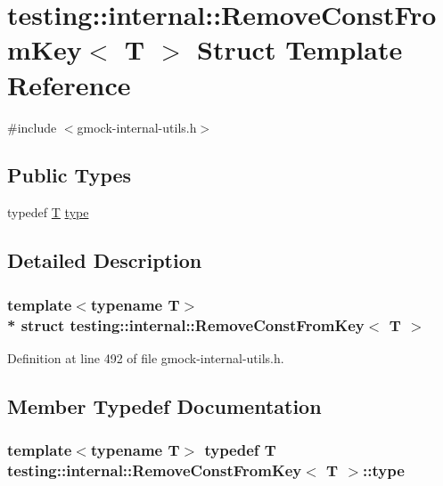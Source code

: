 \hypertarget{structtesting_1_1internal_1_1_remove_const_from_key}{}\section{testing\+:\+:internal\+:\+:Remove\+Const\+From\+Key$<$ T $>$ Struct Template Reference}
\label{structtesting_1_1internal_1_1_remove_const_from_key}


{\ttfamily \#include $<$gmock-\/internal-\/utils.\+h$>$}

\subsection*{Public Types}
\begin{DoxyCompactItemize}
\item 
typedef \hyperlink{functions__7_8js_adf1f3edb9115acb0a1e04209b7a9937b}{T} \hyperlink{structtesting_1_1internal_1_1_remove_const_from_key_ab657b0a0fe4ebc499d27011f73c794c1}{type}
\end{DoxyCompactItemize}


\subsection{Detailed Description}
\subsubsection*{template$<$typename T$>$\\*
struct testing\+::internal\+::\+Remove\+Const\+From\+Key$<$ T $>$}



Definition at line 492 of file gmock-\/internal-\/utils.\+h.



\subsection{Member Typedef Documentation}
\subsubsection[{\texorpdfstring{type}{type}}]{\setlength{\rightskip}{0pt plus 5cm}template$<$typename T$>$ typedef {\bf T} {\bf testing\+::internal\+::\+Remove\+Const\+From\+Key}$<$ {\bf T} $>$\+::{\bf type}}\hypertarget{structtesting_1_1internal_1_1_remove_const_from_key_ab657b0a0fe4ebc499d27011f73c794c1}{}\label{structtesting_1_1internal_1_1_remove_const_from_key_ab657b0a0fe4ebc499d27011f73c794c1}


